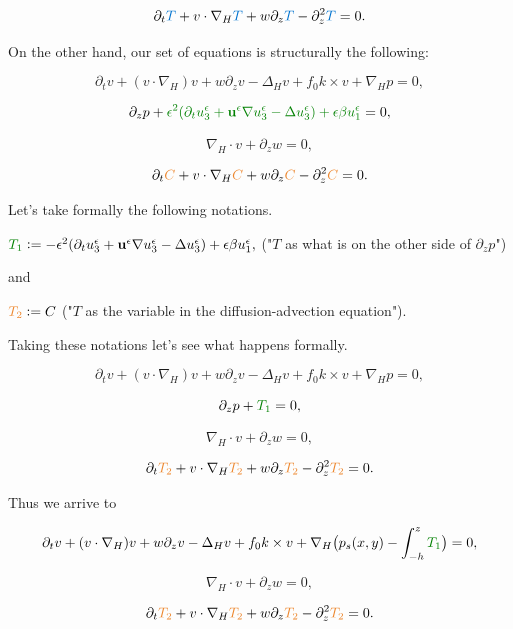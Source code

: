 \documentclass[11pt]{article}
\begin{document}
\begin{enumerate}
$$ \partial_t \textcolor{trueblue}{T}  + v \cdot \nabla_H \textcolor{trueblue}{T}  + w \partial_z \textcolor{trueblue}{T}  - \partial_z ^ 2 \textcolor{trueblue}{T}  = 0. $$

On the other hand, our set of equations is structurally the following:

$$ \partial_t v + (v \cdot \nabla_H) v + w \partial_z v - \Delta_H v + f_0 k \times v + \nabla_H p = 0, $$

$$ \partial_z p + \textcolor{ao}{ \epsilon^2 (\partial_t u^\epsilon_3 + \mathbf{u}^\epsilon \nabla u^\epsilon_3 - \Delta u^\epsilon_3) + \epsilon \beta u^\epsilon_1} = 0, $$

$$ \nabla_H \cdot v + \partial_z w = 0, $$

$$ \partial_t \textcolor{cadmiumorange}{C}  + v \cdot \nabla_H \textcolor{cadmiumorange}{C}  + w \partial_z \textcolor{cadmiumorange}{C}  - \partial_z ^ 2 \textcolor{cadmiumorange}{C}  = 0. $$

Let's take formally the following notations.

$\textcolor{ao}{T_1} :=-  \epsilon^2 (\partial_t u^\epsilon_3 + \mathbf{u}^\epsilon \nabla u^\epsilon_3 - \Delta u^\epsilon_3) + \epsilon \beta u^\epsilon_1,$ ("$T$ as what is on the other side of $\partial_z p$")

and

$\textcolor{cadmiumorange}{T_2}:= C$ ("$T$ as the variable in the diffusion-advection equation").

Taking these notations let's see what happens formally.

$$ \partial_t v + (v \cdot \nabla_H) v + w \partial_z v - \Delta_H v + f_0 k \times v + \nabla_H p = 0, $$

$$ \partial_z p + \textcolor{ao}{T_1} = 0, $$

$$ \nabla_H \cdot v + \partial_z w = 0, $$

$$ \partial_t \textcolor{cadmiumorange}{T_2}  + v \cdot \nabla_H \textcolor{cadmiumorange}{T_2}  + w \partial_z \textcolor{cadmiumorange}{T_2}  - \partial_z ^ 2 \textcolor{cadmiumorange}{T_2}  = 0. $$

Thus we arrive to

$$ \partial_t v + (v \cdot \nabla_H) v + w \partial_z v - \Delta_H v + f_0 k \times v + \nabla_H \big ( p_s (x,y) - \int_{-h}^z \textcolor{ao}{T_1} \big) = 0, $$

$$ \nabla_H \cdot v + \partial_z w = 0, $$

$$ \partial_t \textcolor{cadmiumorange}{T_2}  + v \cdot \nabla_H \textcolor{cadmiumorange}{T_2}  + w \partial_z \textcolor{cadmiumorange}{T_2}  - \partial_z ^ 2 \textcolor{cadmiumorange}{T_2}  = 0. $$


\end{enumerate}
\end{document}
